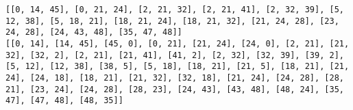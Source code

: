 \documentclass[11pt]{article}
\begin{document}
    \begin{Verbatim}[commandchars=\\\{\}]
[[0, 14, 45], [0, 21, 24], [2, 21, 32], [2, 21, 41], [2, 32, 39], [5, 12, 38], [5, 18, 21], [18, 21, 24], [18, 21, 32], [21, 24, 28], [23, 24, 28], [24, 43, 48], [35, 47, 48]]
[[0, 14], [14, 45], [45, 0], [0, 21], [21, 24], [24, 0], [2, 21], [21, 32], [32, 2], [2, 21], [21, 41], [41, 2], [2, 32], [32, 39], [39, 2], [5, 12], [12, 38], [38, 5], [5, 18], [18, 21], [21, 5], [18, 21], [21, 24], [24, 18], [18, 21], [21, 32], [32, 18], [21, 24], [24, 28], [28, 21], [23, 24], [24, 28], [28, 23], [24, 43], [43, 48], [48, 24], [35, 47], [47, 48], [48, 35]]

    \end{Verbatim}

    \begin{center}
    \end{center}
    { \hspace*{\fill} \\}
    

    
    
    
    
\end{document}
